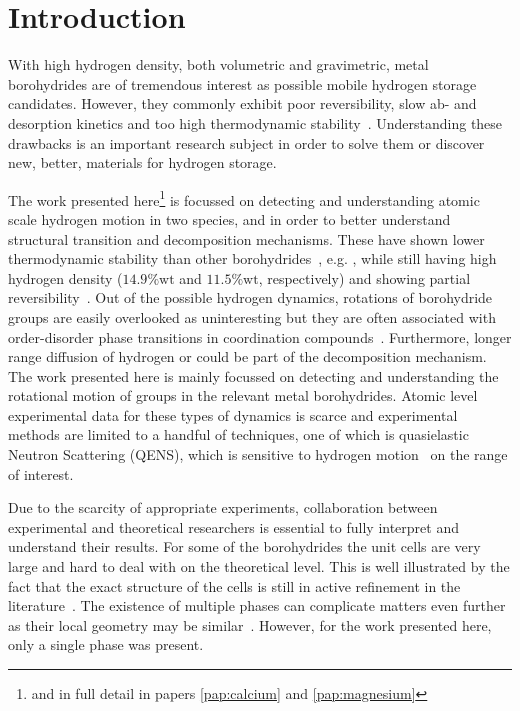 \section{Introduction}
\label{sec:borohydrides-introduction}
With high hydrogen density, both volumetric and gravimetric, metal borohydrides are of tremendous interest as possible mobile hydrogen storage candidates.
However, they commonly exhibit poor reversibility, slow ab- and desorption kinetics and too high thermodynamic stability~\cite{lithium-stability-2003, borohydride-stability-2006, calcium-stability-2006}.
Understanding these drawbacks is an important research subject in order to solve them or discover new, better, materials for hydrogen storage.

The work presented here\footnote{and in full detail in papers \ref{pap:calcium} and \ref{pap:magnesium}} is focussed on detecting and understanding atomic scale hydrogen motion in two species,  and  in order to better understand structural transition and decomposition mechanisms.
These have shown lower thermodynamic stability than other borohydrides~\cite{borohydride-stability-2006, calcium-stability-2006}, e.g. , while still having high hydrogen density ($14.9\%\text{wt}$ and $11.5\%\text{wt}$, respectively) and showing partial reversibility~\cite{magnesium-reversibility-severa-2010, magnesium-reversibility-chong-2011, calcium-reversibility-2007, calcium-reversibility-2008, reversibility-destabilisation-2008}.
Out of the possible hydrogen dynamics, rotations of borohydride groups are easily overlooked as uninteresting but they are often associated with order-disorder phase transitions in coordination compounds~\cite{order-disorder-2010, order-disorder-2006}.
Furthermore, longer range diffusion of hydrogen or  could be part of the decomposition mechanism.
The work presented here is mainly focussed on detecting and understanding the rotational motion of  groups in the relevant metal borohydrides.
Atomic level experimental data for these types of dynamics is scarce and experimental methods are limited to a handful of techniques, one of which is quasielastic Neutron Scattering (QENS), which is sensitive to hydrogen motion~\cite{qens-bee-1988} on the range of interest.

Due to the scarcity of appropriate experiments, collaboration between experimental and theoretical researchers is essential to fully interpret and understand their results.
For some of the borohydrides the unit cells are very large and hard to deal with on the theoretical level.
This is well illustrated by the fact that the exact structure of the cells is still in active refinement in the literature~\cite{cabh42-structure-p42m, cabh42-structure-p4}.
The existence of multiple phases can complicate matters even further as their local geometry may be similar~\cite{mgbh42-structure-fddd, mgbh42-phases-2007, mgbh42-phases-2008, mgbh42-phases-2009}.
However, for the work presented here, only a single phase was present.
